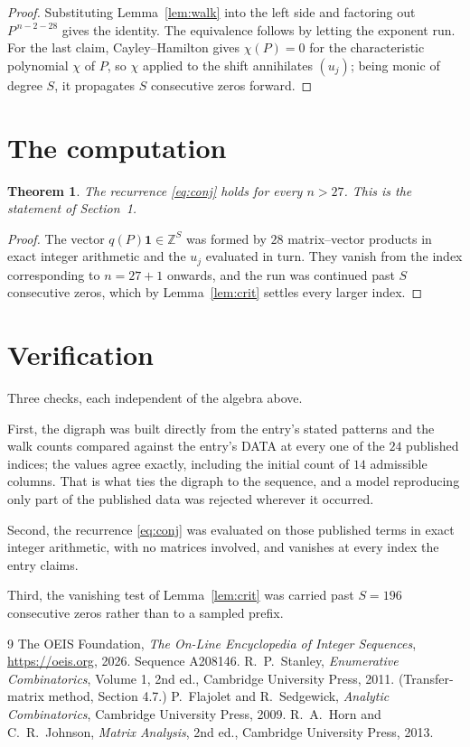\documentclass[11pt,a4paper]{article}
\theoremstyle{plain}
\newtheorem{theorem}{Theorem}
\theoremstyle{definition}
\begin{document}
\begin{proof}
Substituting Lemma~\ref{lem:walk} into the left side and factoring out
$P^{\,n-2-28}$ gives the identity. The equivalence follows by letting the exponent
run. For the last claim, Cayley--Hamilton gives $\chi(P)=0$ for the characteristic
polynomial $\chi$ of $P$, so $\chi$ applied to the shift annihilates $(u_j)$; being monic of
degree $S$, it propagates $S$ consecutive zeros forward.
\end{proof}

\section{The computation}

\begin{theorem}
The recurrence \eqref{eq:conj} holds for every $n>27$. This is the statement of
Section~1.
\end{theorem}

\begin{proof}
The vector $q(P)\mathbf{1}\in\mathbb{Z}^{S}$ was formed by $28$ matrix--vector
products in exact integer arithmetic and the $u_j$ evaluated in turn. They vanish from the
index corresponding to $n=27+1$ onwards, and the run was continued past $S$ consecutive
zeros, which by Lemma~\ref{lem:crit} settles every larger index.
\end{proof}

\section{Verification}

Three checks, each independent of the algebra above.

First, the digraph was built directly from the entry's stated patterns and the walk counts
compared against the entry's DATA at every one of the $24$ published indices; the
values agree exactly, including the initial count of $14$ admissible columns. That is
what ties the digraph to the sequence, and a model reproducing only part of the published
data was rejected wherever it occurred.

Second, the recurrence \eqref{eq:conj} was evaluated on those published terms in exact
integer arithmetic, with no matrices involved, and vanishes at every index the entry claims.

Third, the vanishing test of Lemma~\ref{lem:crit} was carried past $S=196$ consecutive
zeros rather than to a sampled prefix.

\begin{thebibliography}{9}
 The OEIS Foundation, \emph{The On-Line Encyclopedia of Integer
Sequences}, \url{https://oeis.org}, 2026. Sequence A208146.
 R.~P.~Stanley, \emph{Enumerative Combinatorics}, Volume 1, 2nd ed.,
Cambridge University Press, 2011. (Transfer-matrix method, Section 4.7.)
 P.~Flajolet and R.~Sedgewick, \emph{Analytic Combinatorics}, Cambridge
University Press, 2009.
 R.~A.~Horn and C.~R.~Johnson, \emph{Matrix Analysis}, 2nd ed., Cambridge
University Press, 2013.
\end{thebibliography}
\end{document}
